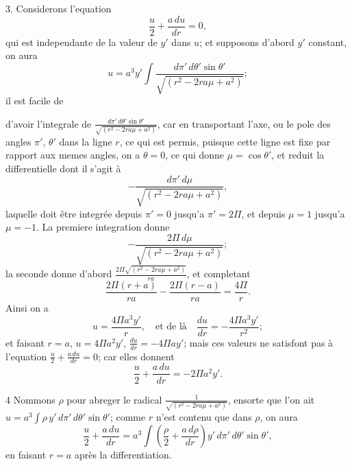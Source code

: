\documentclass[11pt,a4paper]{article}
\begin{document}
3. Considerons l'equation
\[ \frac{u}{2} + \frac{a\,d u}{d r} = 0, \]
qui est independante de la valeur de $y'$ dans $u$; et supposons d'abord $y'$ constant, on aura
\[ u = a^3 y' \int \frac{d\pi'\,d\theta' \sin\theta'}{\sqrt{(r^2 - 2ra\mu + a^2)}}; \]
il est facile de


d'avoir l'integrale de $\frac{d\pi'\,d\theta' \sin\theta'}{\sqrt{(r^2 - 2ra\mu + a^2)}}$, car en transportant l'axe, ou le pole des angles $\pi'$, $\theta'$ dans la ligne $r$, ce qui est permis, puisque cette ligne est fixe par rapport aux memes angles, on a $\theta = 0$, ce qui donne $\mu = \cos\theta'$, et reduit la differentielle dont il s'agit à
\[ -\frac{d\pi'\,d\mu}{\sqrt{(r^2 - 2ra\mu + a^2)}}, \]
laquelle doit être integrée depuis $\pi' = 0$ jusqu'a $\pi' = 2\Pi$, et depuis $\mu = 1$ jusqu'a $\mu = -1$. La premiere integration donne
\[ -\frac{2\Pi\,d\mu}{\sqrt{(r^2 - 2ra\mu + a^2)}}; \]
la seconde donne d'abord $\frac{2\Pi\sqrt{(r^2 - 2ra\mu + a^2)}}{ra}$, et completant
\[ \frac{2\Pi(r+a)}{ra} - \frac{2\Pi(r-a)}{ra} = \frac{4\Pi}{r}. \]
Ainsi on a
\[ u = \frac{4\Pi a^3 y'}{r}, \quad\text{et de là}\quad \frac{d u}{d r} = -\frac{4\Pi a^3 y'}{r^2}; \]
et faisant $r = a$, $u = 4\Pi a^2 y'$, $\frac{d u}{d r} = -4\Pi a y'$; mais ces valeurs ne satisfont pas à l'equation $\frac{u}{2} + \frac{a\,d u}{d r} = 0$; car elles donnent
\[ \frac{u}{2} + \frac{a\,d u}{d r} = -2\Pi a^2 y'. \]

4 Nommons $\rho$ pour abreger le radical $\frac{1}{\sqrt{(r^2 - 2ra\mu + a^2)}}$, ensorte que l'on ait $u = a^3 \int \rho\, y'\,d\pi'\,d\theta' \sin\theta'$; comme $r$ n'est contenu que dans $\rho$, on aura
\[ \frac{u}{2} + \frac{a\,d u}{d r} = a^3 \int \left(\frac{\rho}{2} + \frac{a\,d\rho}{d r}\right) y'\,d\pi'\,d\theta' \sin\theta', \]
\struck{\ill{}}en faisant $r = a$ après la differentiation.
\end{document}
